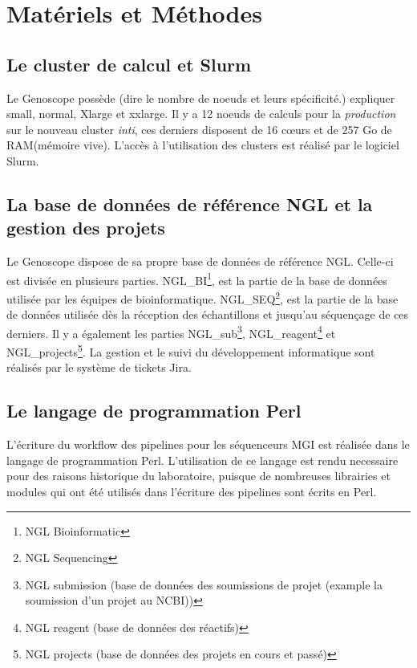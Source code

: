 \section{Matériels et Méthodes}
\subsection{Le cluster de calcul et Slurm}
Le Genoscope possède (dire le nombre de noeuds et leurs spécificité.)
expliquer small, normal, Xlarge et xxlarge.
Il y a 12 noeuds de calculs pour la \emph{production} sur le nouveau cluster \emph{inti}, ces derniers disposent de 16 cœurs et de 257 Go de RAM(mémoire vive). L'accès à l'utilisation des clusters est réalisé par le logiciel Slurm.

\subsection{La base de données de référence NGL et la gestion des projets}
Le Genoscope dispose de sa propre base de données de référence NGL. Celle-ci est divisée en plusieurs parties. NGL\_BI\footnote{NGL Bioinformatic}, est la partie de la base de données utilisée par les équipes de bioinformatique. NGL\_SEQ\footnote{NGL Sequencing}, est la partie de la base de données utilisée dès la réception des échantillons et jusqu'au séquençage de ces derniers. Il y a également les parties NGL\_sub\footnote{NGL submission (base de données des soumissions de projet (example la soumission d'un projet au NCBI))}, NGL\_reagent\footnote{NGL reagent (base de données des réactifs)} et NGL\_projects\footnote{NGL projects (base de données des projets en cours et passé)}. La gestion et le suivi du développement informatique sont réalisés par le système de tickets Jira.

\subsection{Le langage de programmation Perl}
L'écriture du workflow des pipelines pour les séquenceurs MGI est réalisée dans le langage de programmation Perl. L'utilisation de ce langage est rendu necessaire pour des raisons historique du laboratoire, puisque de nombreuses librairies et modules qui ont été utilisés dans l'écriture des pipelines sont écrits en Perl.\\

